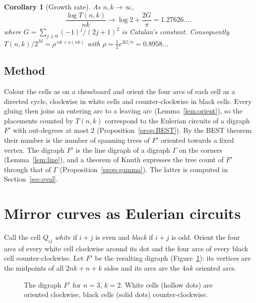 \documentclass[11pt,a4paper]{amsart}
\newtheorem{corollary}[theorem]{Corollary}
\theoremstyle{remark}
\newcommand{\G}{\Gamma}
\begin{document}
\begin{corollary}[Growth rate]\label{cor:growth}
As $n,k\to\infty$,
\[ \frac{\log T(n,k)}{nk}\longrightarrow \log 2+\frac{2G}{\pi}=1.27626\ldots, \]
where $G=\sum_{j\ge0}(-1)^j/(2j+1)^2$ is Catalan's constant. Consequently
$T(n,k)/2^{M}=\rho^{\,nk+o(nk)}$ with $\rho=\tfrac12 e^{2G/\pi}=0.8958\ldots$
\end{corollary}

\subsection{Method}
Colour the cells as on a chessboard and orient the four arcs of each cell as a directed cycle, clockwise in
white cells and counter-clockwise in black cells. Every gluing then joins an entering arc to a leaving arc
(Lemma~\ref{lem:orient}), so the placements counted by $T(n,k)$ correspond to the Eulerian circuits of a digraph
$F'$ with out-degrees at most $2$ (Proposition~\ref{prop:BEST}). By the BEST theorem \cite{AEB,TS} their number is
the number of spanning trees of $F'$ oriented towards a fixed vertex. The digraph $F'$ is the line digraph of a
digraph $\G$ on the corners (Lemma~\ref{lem:line}), and a theorem of Knuth \cite{Knuth} expresses the tree count
of $F'$ through that of $\G$ (Proposition~\ref{prop:gamma}). The latter is computed in Section~\ref{sec:eval}.


\section{Mirror curves as Eulerian circuits}\label{sec:euler}

Call the cell $Q_{ij}$ \emph{white} if $i+j$ is even and \emph{black} if $i+j$ is odd. Orient the four arcs of
every white cell clockwise around its dot and the four arcs of every black cell counter-clockwise. Let $F'$ be
the resulting digraph (Figure~\ref{fig:Fprime}): its vertices are the midpoints of all $2nk+n+k$ sides and its
arcs are the $4nk$ oriented arcs.

\begin{figure}[ht]
\centering
{}
\caption{The digraph $F'$ for $n=3$, $k=2$. White cells (hollow dots) are oriented clockwise, black cells
(solid dots) counter-clockwise.}\label{fig:Fprime}
\end{figure}
\end{document}
